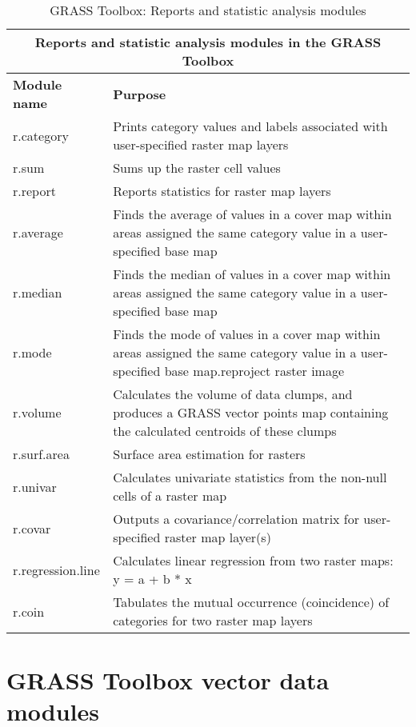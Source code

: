 \begin{table}[H]
\centering
 \begin{tabular}{|p{4cm}|p{10cm}|}
  \hline \multicolumn{2}{|c|}{\textbf{Reports and statistic analysis modules in the GRASS Toolbox}} \\
  \hline \textbf{Module name} & \textbf{Purpose} \\
  \hline r.category & Prints category values and labels associated with
  user-specified raster map layers \\
  \hline r.sum & Sums up the raster cell values \\
  \hline r.report & Reports statistics for raster map layers \\
  \hline r.average & Finds the average of values in a cover map within areas
  assigned the same category value in a user-specified base map \\
  \hline r.median & Finds the median of values in a cover map within areas
  assigned the same category value in a user-specified base map \\
  \hline r.mode & Finds the mode of values in a cover map within areas
  assigned the same category value in a user-specified base map.reproject
  raster image \\
  \hline r.volume & Calculates the volume of data clumps, and produces a
  GRASS vector points map containing the calculated centroids of these clumps \\
  \hline r.surf.area & Surface area estimation for rasters \\
  \hline r.univar & Calculates univariate statistics from the non-null cells
  of a raster map \\
  \hline r.covar & Outputs a covariance/correlation matrix for user-specified
  raster map layer(s)\\
  \hline r.regression.line & Calculates linear regression from two raster
  maps: y = a + b * x \\
  \hline r.coin & Tabulates the mutual occurrence (coincidence) of categories
  for two raster map layers\\
\hline
\end{tabular}
\caption{GRASS Toolbox: Reports and statistic analysis modules}
\end{table}

\clearpage

\section{GRASS Toolbox vector data modules}

